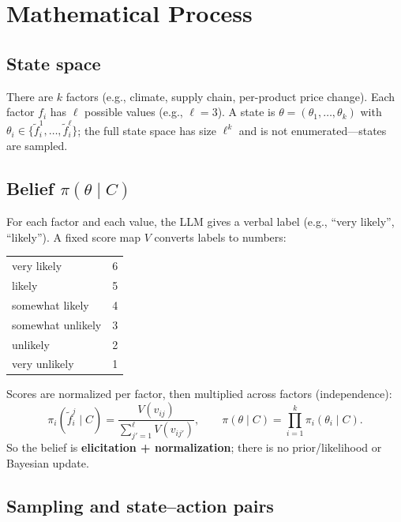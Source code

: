 \documentclass[11pt]{article}
\begin{document}
\section{Mathematical Process}

\subsection{State space}

There are $k$ factors (e.g., climate, supply chain, per-product price change). Each factor $f_i$ has $\ell$ possible values (e.g., $\ell=3$). A state is $\theta = (\theta_1,\ldots,\theta_k)$ with $\theta_i \in \{\tilde{f}_i^1,\ldots,\tilde{f}_i^\ell\}$; the full state space has size $\ell^k$ and is not enumerated---states are sampled.

\subsection{Belief $\pi(\theta\mid C)$}

For each factor and each value, the LLM gives a verbal label (e.g., ``very likely'', ``likely''). A fixed score map $V$ converts labels to numbers:

\begin{center}
\begin{tabular}{|l|c|}
\hline
very likely & 6 \\
likely & 5 \\
somewhat likely & 4 \\
somewhat unlikely & 3 \\
unlikely & 2 \\
very unlikely & 1 \\
\hline
\end{tabular}
\end{center}

Scores are normalized per factor, then multiplied across factors (independence):
\begin{equation}\label{eq:pi_i}
\pi_i(\tilde{f}_i^j \mid C) = \frac{V(v_{ij})}{\sum_{j'=1}^{\ell} V(v_{ij'})},
\qquad
\pi(\theta \mid C) = \prod_{i=1}^{k} \pi_i(\theta_i \mid C).
\end{equation}
So the belief is \textbf{elicitation + normalization}; there is no prior/likelihood or Bayesian update.

\subsection{Sampling and state--action pairs}
\end{document}
